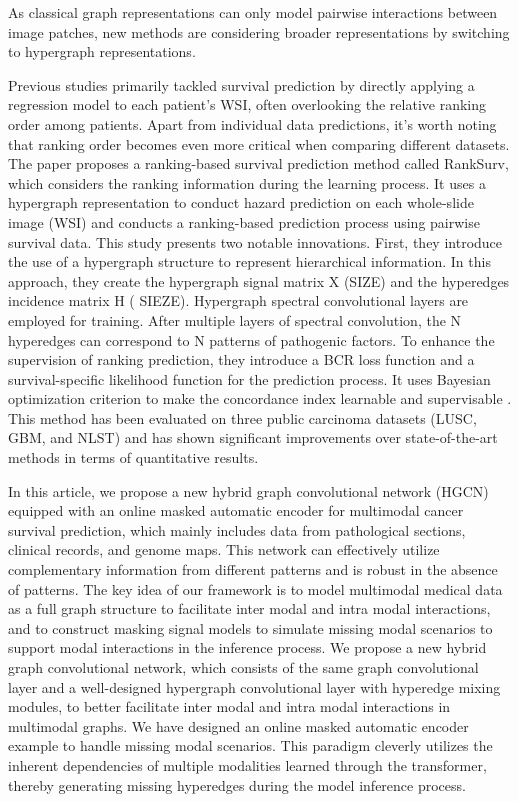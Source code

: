 \documentclass[journal,twoside,web]{ieeecolor}
\begin{document}
As classical graph representations can only model pairwise interactions between image patches, new methods are considering broader representations by switching to hypergraph representations.

Previous studies primarily tackled survival prediction by directly applying a regression model to each patient's WSI, often overlooking the relative ranking order among patients. Apart from individual data predictions, it's worth noting that ranking order becomes even more critical when comparing different datasets. The paper proposes a ranking-based survival prediction method called RankSurv\cite{di2020ranking}, which considers the ranking information during the learning process. It uses a hypergraph representation to conduct hazard prediction on each whole-slide image (WSI) and conducts a ranking-based prediction process using pairwise survival data. This study presents two notable innovations. First, they introduce the use of a hypergraph structure to represent hierarchical information. In this approach, they create the hypergraph signal matrix X (SIZE) and the hyperedges incidence matrix H ( SIEZE). Hypergraph spectral convolutional layers are employed for training. After multiple layers of spectral convolution, the N hyperedges can correspond to N patterns of pathogenic factors. To enhance the supervision of ranking prediction, they introduce a BCR loss function and a survival-specific likelihood function for the prediction process. It uses Bayesian optimization criterion to make the concordance index learnable and supervisable . This method has been evaluated on three public carcinoma datasets (LUSC, GBM, and NLST) and has shown significant improvements over state-of-the-art methods in terms of quantitative results.





In this article, we propose a new hybrid graph convolutional network (HGCN) \cite{hou2023hybrid}equipped with an online masked automatic encoder for multimodal cancer survival prediction, which mainly includes data from pathological sections, clinical records, and genome maps. This network can effectively utilize complementary information from different patterns and is robust in the absence of patterns. The key idea of our framework is to model multimodal medical data as a full graph structure to facilitate inter modal and intra modal interactions, and to construct masking signal models to simulate missing modal scenarios to support modal interactions in the inference process. We propose a new hybrid graph convolutional network, which consists of the same graph convolutional layer and a well-designed hypergraph convolutional layer with hyperedge mixing modules, to better facilitate inter modal and intra modal interactions in multimodal graphs. We have designed an online masked automatic encoder example to handle missing modal scenarios. This paradigm cleverly utilizes the inherent dependencies of multiple modalities learned through the transformer, thereby generating missing hyperedges during the model inference process.
\end{document}
